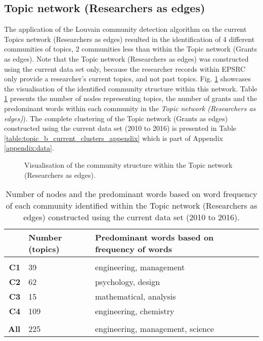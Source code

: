 {\subsection{Topic network (Researchers as edges)}

The application of the Louvain community detection algorithm on the current Topics network (Researchers as edges) resulted in the identification of 4 different communities of topics, 2 communities less than within the Topic network (Grants as edges). Note that the Topic network (Researchers as edges) was constructed using the current data set only, because the researcher records within EPSRC only provide a researcher's current topics, and not past topics. Fig. \ref{fig:topic_b_current_cs} showcases the visualisation of the identified community structure within this network. Table \ref{table:topic_b_current_numbers} presents the number of nodes representing topics, the number of grants and the predominant words within each community in the \textit{Topic network (Researchers as edges)}). The complete clustering of the Topic network (Grants as edges) constructed using the current data set (2010 to 2016) is presented in Table \ref{table:topic_b_current_clusters_appendix} which is part of Appendix \ref{appendix:data}.

\begin{figure}[!htpb]
    \centering
    \caption[Visualisation of the community structure within the Topic network (Researchers as edges).]{Visualisation of the community structure within the Topic network (Researchers as edges).}
    \label{fig:topic_b_current_cs}
\end{figure}

\begin{table}[!htbp]
\centering
\caption[Number of nodes and the predominant words of each community identified in the Topic network (Researchers as edges) constructed using the current data set (2010 to 2016).]{Number of nodes and the predominant words based on word frequency of each community identified within the Topic network (Researchers as edges) constructed using the current data set (2010 to 2016).}
\label{table:topic_b_current_numbers}
\begin{tabular}{r|>{\raggedleft\arraybackslash}p{1.6cm}>{\raggedleft\arraybackslash}p{6.5cm}}
{} & \textbf{Number (topics)} & \textbf{Predominant words based on frequency of words}\\
\hline\\
\textbf{C1}  & {39}  & {engineering, management}\\
\textbf{C2}  & {62}  & {psychology, design}\\
\textbf{C3}  & {15}  & {mathematical, analysis}\\
\textbf{C4}  & {109} & {engineering, chemistry}\\
\hline\\
\textbf{All} & {225} & {engineering, management, science}\\
\end{tabular}
\end{table}

}
